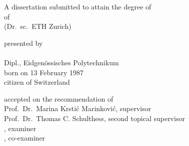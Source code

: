 \begin{titlepage}
    \begin{center}
        \large
        \begingroup
        \endgroup

        \hfill

        \vfill

        \begingroup
            \spacedallcaps{\myTitle}
        \endgroup

        \vfill

        \begingroup
            A dissertation submitted to attain the degree of \\
            \vspace{0.5em}
            of
             \\
            (Dr.\ sc.\ ETH Zurich)
        \endgroup

        \vfill

        \begingroup
            presented by\\
            \vspace{0.5em}
            \spacedlowsmallcaps{\myName} \\
            Dipl., Eidgenössisches Polytechnikum \\
            \vspace{0.5em}
            born on 13 February 1987 \\
            citizen of Switzerland
        \endgroup

        \vfill

        \begingroup
            accepted on the recommendation of \\
            \vspace{0.5em}
            Prof.\ Dr.\ Marina Krstić Marinković, supervisor \\
            Prof.\ Dr.\ Thomas C. Schulthess, second topical supervisor \\
            , examiner \\
            , co-examiner \\
        \endgroup

        \vfill

        \myTime%

        \vfill
    \end{center}
\end{titlepage}
